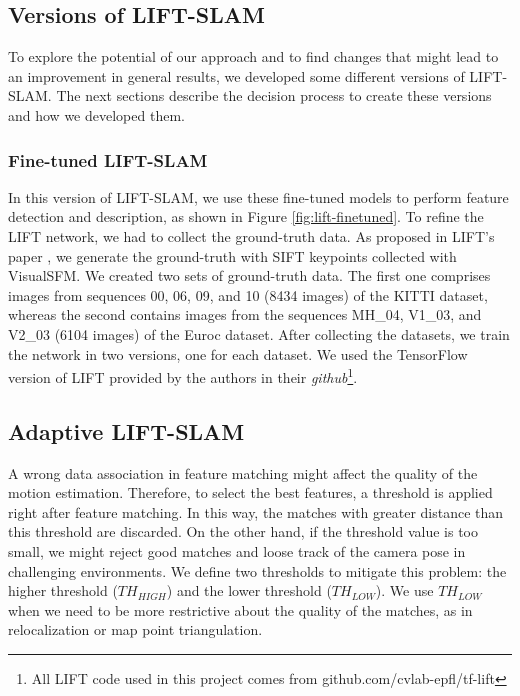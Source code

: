 \subsection{Versions of LIFT-SLAM}
To explore the potential of our approach and to find changes that might lead to an improvement in general results, we developed some different versions of LIFT-SLAM. The next sections describe the decision process to create these versions and how we developed them.

\subsubsection{Fine-tuned LIFT-SLAM}
\label{sec:finetuned-lift}

In this version of LIFT-SLAM, we use these fine-tuned models to perform feature detection and description, as shown in Figure \ref{fig:lift-finetuned}. To refine the LIFT network, we had to collect the ground-truth data. As proposed in LIFT's paper \cite{lift}, we generate the ground-truth with SIFT keypoints collected with VisualSFM. We created two sets of ground-truth data. The first one comprises images from sequences 00, 06, 09, and 10 (8434 images) of the KITTI dataset, whereas the second contains images from the sequences MH\_04, V1\_03, and V2\_03 (6104 images) of the Euroc dataset. After collecting the datasets, we train the network in two versions, one for each dataset. We used the TensorFlow version of LIFT provided by the authors in their \textit{github}\footnote{All LIFT code used in this project comes from github.com/cvlab-epfl/tf-lift}. %


\subsection{Adaptive LIFT-SLAM}
A wrong data association in feature matching might affect the quality of the motion estimation. Therefore, to select the best features, a threshold is applied right after feature matching. In this way, the matches with greater distance than this threshold are discarded. On the other hand, if the threshold value is too small, we might reject good matches and loose track of the camera pose in challenging environments. We define two thresholds to mitigate this problem: the higher threshold ($TH_{HIGH}$) and the lower threshold ($TH_{LOW}$). We use $TH_{LOW}$ when we need to be more restrictive about the quality of the matches, as in relocalization or map point triangulation.

